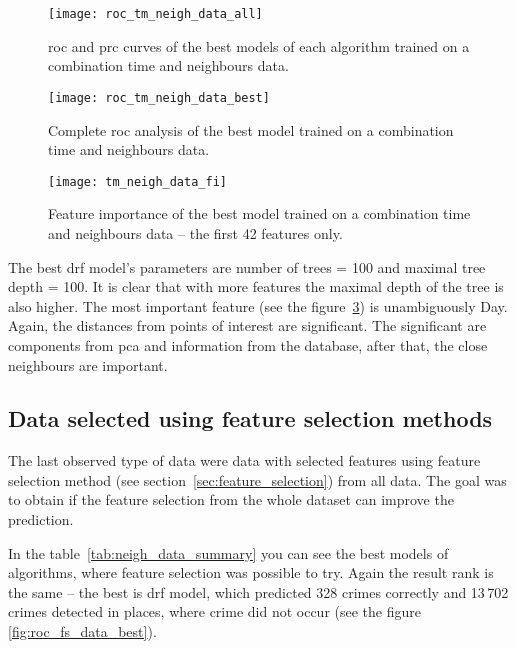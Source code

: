 \documentclass[thesis=M,english]{FITthesis}[2012/10/20]
\begin{document}
\begin{figure}[ht]\centering
    \texttt{[image: roc\_tm\_neigh\_data\_all]}\label{fig:roc_tm_neigh_data_all}
    \caption{\gls{roc} and \gls{prc} curves of the best models of each algorithm trained on a combination time and neighbours data.}
\end{figure}

\begin{figure}[ht]\centering
    \texttt{[image: roc\_tm\_neigh\_data\_best]}\label{fig:roc_tm_neigh_data_best}
    \caption{Complete \gls{roc} analysis of the best model trained on a combination time and neighbours data.}
\end{figure}

\begin{figure}[ht]\centering
    \texttt{[image: tm\_neigh\_data\_fi]}\label{fig:tm_neigh_data_fi}
    \caption{Feature importance of the best model trained on a combination time and neighbours data -- the first 42 features only.}
\end{figure}

The best \gls{drf} model's parameters are number of trees = 100 and maximal tree depth = 100. It is clear that with more features the maximal depth of the tree is also higher. The most important feature (see the figure~\ref{fig:tm_neigh_data_fi}) is unambiguously Day. Again, the distances from points of interest are significant. The significant are components from \gls{pca} and information from the database, after that, the close neighbours are important.


\subsection{Data selected using feature selection methods}

The last observed type of data were data with selected features using feature selection method (see section~\ref{sec:feature_selection}) from all data. The goal was to obtain if the feature selection from the whole dataset can improve the prediction. 

In the table~\ref{tab:neigh_data_summary} you can see the best models of algorithms, where feature selection was possible to try. Again the result rank is the same -- the best is \gls{drf} model, which predicted 328 crimes correctly and 13\,702 crimes detected in places, where crime did not occur (see the figure~ \ref{fig:roc_fs_data_best}). 
\end{document}
